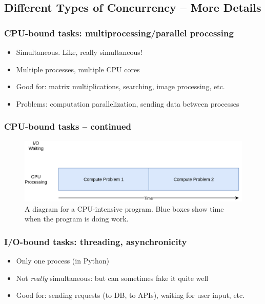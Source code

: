 \documentclass{beamer}
\begin{document}
    \subsection{Different Types of Concurrency -- More Details}

    \begin{frame}
        \frametitle{CPU-bound tasks: multiprocessing/parallel processing}

        \begin{itemize}
            \item Simultaneous. Like, really simultaneous!
            \item Multiple processes, multiple CPU cores
            \item Good for: matrix multiplications, searching, image processing, etc.
            \item Problems: computation parallelization, sending data between processes
        \end{itemize}

    \end{frame}

    \begin{frame}
        \frametitle{CPU-bound tasks -- continued}

        \begin{figure}
            \includegraphics{../figures/CPUBound.png}
            \caption{A diagram for a CPU-intensive program. Blue boxes show time when the program is doing work.}
        \end{figure}

    \end{frame}


    \begin{frame}
        \frametitle{I/O-bound tasks: threading, asynchronicity}

        \begin{itemize}
            \item Only one process (in Python)
            \item Not \emph{really} simultaneous: but can sometimes fake it quite well
            \item Good for: sending requests (to DB, to APIs), waiting for user input, etc.
        \end{itemize}

    \end{frame}
\end{document}
